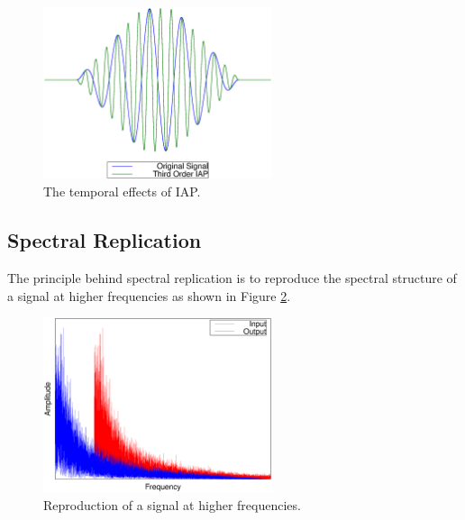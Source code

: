 			\begin{figure}[h!]
				\centering
				\includegraphics[width=0.6\textwidth]{chapter3/Images/IAPTemporalEffects.eps}
				\caption{The temporal effects of IAP.}
				\label{fig:IAPTemporalEffects}
			\end{figure}
			

	\subsection{Spectral Replication}
	\label{sec:Excitation-SpectralReplication}
		The principle behind spectral replication is to reproduce the spectral structure of a signal at higher
		frequencies as shown in Figure \ref{fig:SpectralReplication}.

		\begin{figure}[h!]
			\centering
			\includegraphics[width=0.6\textwidth]{chapter3/Images/SpectralReplicationSpectrum.eps}
			\caption{Reproduction of a signal at higher frequencies.}
			\label{fig:SpectralReplication}
		\end{figure}

